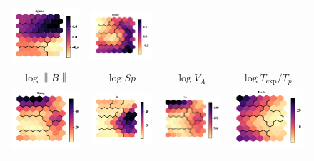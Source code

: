 \documentclass[utf8]{frontiersSCNS} %
\begin{document}
\begin{figure}[h!]
\begin{tabular}{CCCC}
		\includegraphics[width=4cm]{Amaya/comp-map-sigmac} &
		\includegraphics[width=4cm]{Amaya/comp-map-sigmar}\hfill
		\\
		$\log \left\lVert B \right\rVert $ & $\log Sp$ & $\log V_{A}$ & $\log T_{\text{exp}}/T_p$ \\
		\includegraphics[width=4cm]{Amaya/comp-map-log_Bmag} &
		\includegraphics[width=4cm]{Amaya/comp-map-log_Sp} &
		\includegraphics[width=4cm]{Amaya/comp-map-log_Va} &
		\includegraphics[width=4cm]{Amaya/comp-map-log_Tratio}\hfill

\end{tabular}
\end{figure}
\end{document}
